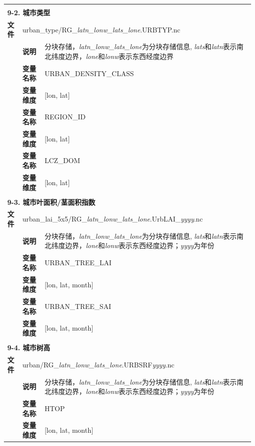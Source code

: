 \documentclass[a4paper,12pt,twoside]{article}
\begin{document}
{\begin{longtable}{llp{}}
\midrule
\vspace{2\baselineskip}\\
\multicolumn{3}{l}{\textbf{9-2. 城市类型}} \\
\cline{1-3}
\textbf{文件} & \multicolumn{2}{l}{urban\_type/RG\_\textit{latn\_lonw\_lats\_lone}.URBTYP.nc} \\
& \textbf{说明} & 分块存储，\textit{latn\_lonw\_lats\_lone}为分块存储信息, \textit{lats}和\textit{latn}表示南北纬度边界，\textit{lone}和\textit{lonw}表示东西经度边界 \\
\cline{2-3}
& \textbf{变量名称} & URBAN\_DENSITY\_CLASS \\
& \textbf{变量维度} & {[}lon, lat{]} \\
\cline{2-3}
& \textbf{变量名称} & REGION\_ID \\
& \textbf{变量维度} & {[}lon, lat{]} \\
\cline{2-3}
& \textbf{变量名称} & LCZ\_DOM \\
& \textbf{变量维度} & {[}lon, lat{]} \\

\midrule
\vspace{2\baselineskip}\\
\multicolumn{3}{l}{\textbf{9-3. 城市叶面积/茎面积指数}} \\
\cline{1-3}
\textbf{文件} & \multicolumn{2}{l}{urban\_lai\_5x5/RG\_\textit{latn\_lonw\_lats\_lone}.UrbLAI\_\textit{yyyy}.nc} \\
& \textbf{说明} & 分块存储，\textit{latn\_lonw\_lats\_lone}为分块存储信息, \textit{lats}和\textit{latn}表示南北纬度边界，\textit{lone}和\textit{lonw}表示东西经度边界；\textit{yyyy}为年份 \\
\cline{2-3}
& \textbf{变量名称} & URBAN\_TREE\_LAI \\
& \textbf{变量维度} & {[}lon, lat, month{]} \\
\cline{2-3}
& \textbf{变量名称} & URBAN\_TREE\_SAI \\
& \textbf{变量维度} & {[}lon, lat, month{]} \\

\midrule
\vspace{2\baselineskip}\\
\multicolumn{3}{l}{\textbf{9-4. 城市树高}} \\
\cline{1-3}
\textbf{文件} & \multicolumn{2}{l}{urban/RG\_\textit{latn\_lonw\_lats\_lone}.URBSRF\textit{yyyy}.nc} \\
& \textbf{说明} & 分块存储，\textit{latn\_lonw\_lats\_lone}为分块存储信息, \textit{lats}和\textit{latn}表示南北纬度边界，\textit{lone}和\textit{lonw}表示东西经度边界；\textit{yyyy}为年份 \\
\cline{2-3}
& \textbf{变量名称} & HTOP \\
& \textbf{变量维度} & {[}lon, lat, month{]} \\


\end{longtable}}
\end{document}
